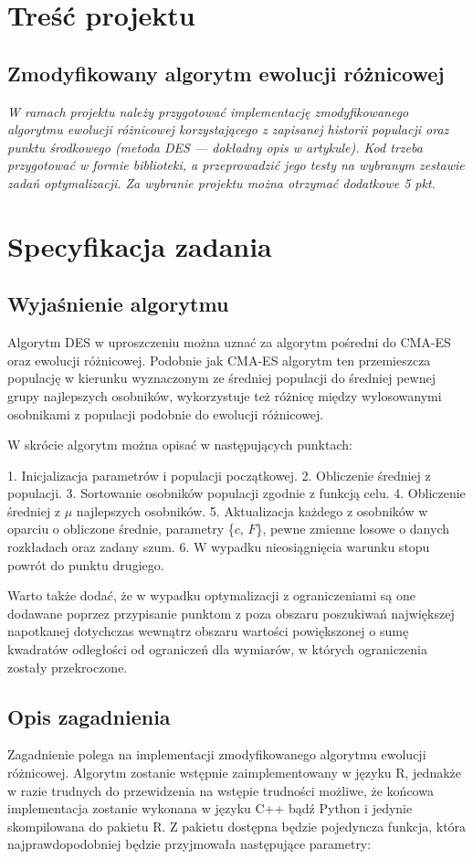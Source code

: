 \chapter{Treść projektu}
\section{Zmodyfikowany algorytm ewolucji różnicowej}
\textit{W ramach projektu należy przygotować implementację zmodyfikowanego algorytmu ewolucji różnicowej korzystającego z zapisanej historii populacji oraz punktu środkowego (metoda DES --- dokładny opis w artykule). Kod trzeba przygotować w formie biblioteki, a przeprowadzić jego testy na wybranym zestawie zadań optymalizacji. Za wybranie projektu można otrzymać dodatkowe 5 pkt.}

\chapter{Specyfikacja zadania}
\section{Wyjaśnienie algorytmu}
Algorytm DES w uproszczeniu można uznać za algorytm pośredni do CMA-ES oraz ewolucji różnicowej. Podobnie jak CMA-ES algorytm ten przemieszcza populację w kierunku wyznaczonym ze średniej populacji do średniej pewnej grupy najlepszych osobników, wykorzystuje też różnicę między wylosowanymi osobnikami z populacji podobnie do ewolucji różnicowej.

W skrócie algorytm można opisać w następujących punktach:

    1. Inicjalizacja parametrów i populacji początkowej.
    2. Obliczenie średniej z populacji.
    3. Sortowanie osobników populacji zgodnie z funkcją celu.
    4. Obliczenie średniej z $\mu$ najlepszych osobników.
    5. Aktualizacja każdego z osobników w oparciu o obliczone średnie, parametry \{$c$, $F$\}, pewne zmienne losowe o danych rozkładach oraz zadany szum.
    6. W wypadku nieosiągnięcia warunku stopu powrót do punktu drugiego.

Warto także dodać, że w wypadku optymalizacji z ograniczeniami są one dodawane poprzez przypisanie punktom z poza obszaru poszukiwań największej napotkanej dotychczas wewnątrz obszaru wartości powiększonej o sumę kwadratów odległości od ograniczeń dla wymiarów, w których ograniczenia zostały przekroczone.

\section{Opis zagadnienia}
Zagadnienie polega na implementacji zmodyfikowanego algorytmu ewolucji różnicowej. Algorytm zostanie wstępnie zaimplementowany w języku R, jednakże w razie trudnych do przewidzenia na wstępie trudności możliwe, że końcowa implementacja zostanie wykonana w języku C++ bądź Python i jedynie skompilowana do pakietu R. Z pakietu dostępna będzie pojedyncza funkcja, która najprawdopodobniej będzie przyjmowała następujące parametry:

